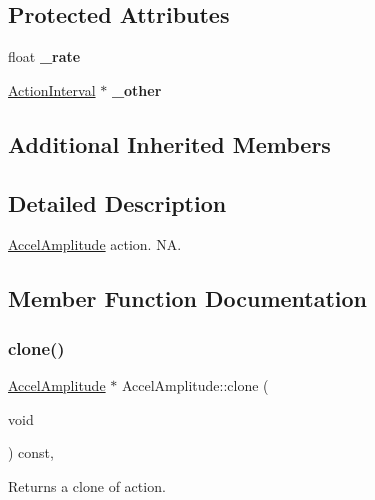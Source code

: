 \subsection*{Protected Attributes}
\begin{DoxyCompactItemize}
\item 
\mbox{\label{classAccelAmplitude_a972a399d062706d8e84bc01c1bfff656}} 
float {\bfseries \+\_\+rate}
\item 
\mbox{\label{classAccelAmplitude_a129f5a02f185d8b460931da16637eaee}} 
\hyperlink{classActionInterval}{Action\+Interval} $\ast$ {\bfseries \+\_\+other}
\end{DoxyCompactItemize}
\subsection*{Additional Inherited Members}


\subsection{Detailed Description}
\hyperlink{classAccelAmplitude}{Accel\+Amplitude} action.  NA. 

\subsection{Member Function Documentation}
\mbox{\label{classAccelAmplitude_aadcd81e8ae9f9d3e32541995b75eca51}} 
\subsubsection{\texorpdfstring{clone()}{clone()}\hspace{0.1cm}{\footnotesize\ttfamily [1/2]}}
{\footnotesize\ttfamily \hyperlink{classAccelAmplitude}{Accel\+Amplitude} $\ast$ Accel\+Amplitude\+::clone (\begin{DoxyParamCaption}\item[{void}]{ }\end{DoxyParamCaption}) const\hspace{0.3cm}{\ttfamily [override]}, {\ttfamily [virtual]}}

Returns a clone of action.


